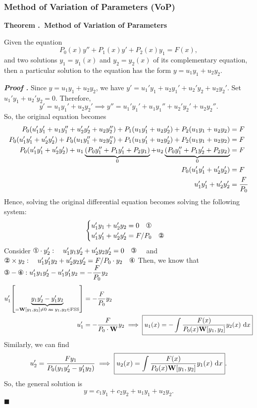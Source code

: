 \documentclass[12pt, a4paper]{article}
\newcounter{index}[subsection]
\newenvironment*{thm}[1]{\begin{tcolorbox}\par\noindent\textbf{Theorem \thesubsection.\stepcounter{index}\theindex\ #1} \par}{\par\end{tcolorbox}}
\newcounter{nprf}[subsection]
\newenvironment*{prf}{\par\indent\textbf{\textit{Proof \stepcounter{nprf}\thenprf.}}}{\hfill$\blacksquare$\par}
\def\d{{\mathrm{d}}}
\def\W{\vb W}
\begin{document}
\subsubsection{Method of Variation of Parameters (VoP)}
\begin{thm}{Method of Variation of Parameters}
	Given the equation \[P_0(x)y''+P_1(x)y'+P_2(x)y_1=F(x),\] and two solutions $y_1=y_1(x)$ and $y_2=y_2(x)$ of its complementary equation, then a particular solution to the equation has the form $y=u_1y_1+u_2y_2$.
\end{thm}
\begin{prf}
	Since $y=u_1y_1+u_2y_2$, we have $y'=u_1'y_1+u_2y_1'+u_2'y_2+u_2y_2'$. Set $\boxed{u_1'y_1+u_2'y_2=0}$. Therefore, \[y'=u_1y_1'+u_2y_2'\implies y''=u_1'y_1'+u_1y_1''+u_2'y_2'+u_2y_2''.\] So, the original equation becomes \begin{align*}P_0\qty(u_1'y_1'+u_1y_1''+u_2'y_2'+u_2y_2'')+P_1\qty(u_1y_1'+u_2y_2')+P_2\qty(u_1y_1+u_2y_2)&=F\\P_0\qty(u_1'y_1'+u_2'y_2')+P_0\qty(u_1y_1''+u_2y_2'')+P_1\qty(u_1y_1'+u_2y_2')+P_2\qty(u_1y_1+u_2y_2)&=F\\P_0\qty(u_1'y_1'+u_2'y_2')+u_1\underbrace{\qty(P_0y_1''+P_1y_1'+P_2y_1)}_0+u_2\underbrace{\qty(P_0y_1''+P_1y_2'+P_2y_2)}_0&=F\\P_0\qty(u_1'y_1'+u_2'y_2')&=F\\u_1'y_1'+u_2'y_2'&=\dfrac{F}{P_0}\end{align*} Hence, solving the original differential equation becomes solving the following system: \[\begin{cases}u_1'y_1+u_2'y_2=0\quad\text{\ding{172}}\\u_1'y_1'+u_2'y_2'=F/P_0\quad\text{\ding{173}}\end{cases}\] Consider $\text{\ding{172}}\cdot y_2':\quad u_1'y_1y_2'+u_2'y_2y_2'=0\quad\text{\ding{174}}\quad$ and $\text{\ding{173}}\times y_2:\quad u_1'y_1'y_2+u_2'y_2y_2'=F/P_0\cdot y_2\quad\text{\ding{175}}$ Then, we know that $\text{\ding{174}}-\text{\ding{175}}: u_1'y_1y_2'-u_1'y_1'y_2=-\dfrac{F}{P_0}y_2$\begin{align*}u_1'\qty[\underbrace{y_1y_2'-y_1'y_2}_{=\W[y_1,y_2]\neq0\text{ as }y_1,y_2\in\text{FSS}}]&=-\dfrac{F}{P_0}y_2\\u_1'&=-\dfrac{F}{P_0\cdot\W}y_2\implies\boxed{u_1(x)=-\int\dfrac{F(x)}{P_0(x)\W[y_1,y_2]}y_2(x)\ \d{x}}\end{align*} Similarly, we can find \[u_2'=\dfrac{Fy_1}{P_0\qty(y_1y_2'-y_1'y_2)}\implies\boxed{u_2(x)=\int\dfrac{F(x)}{P_0(x)\W[y_1,y_2]}y_1(x)\ \d{x}}.\] So, the general solution is \[y=c_1y_1+c_2y_2+u_1y_1+u_2y_2.\]
\end{prf}
\end{document}
